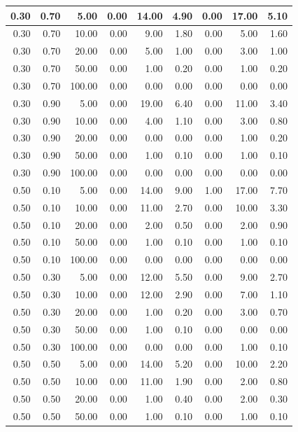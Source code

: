 \documentclass{bmstu}
\begin{document}
\begin{longtable}{|r|r|r|r|r|r|r|r|r|}
0.30 & 0.70 & 5.00 & 0.00 & 14.00 & 4.90 & 0.00 & 17.00 & 5.10 \\ \hline
0.30 & 0.70 & 10.00 & 0.00 & 9.00 & 1.80 & 0.00 & 5.00 & 1.60 \\ \hline
0.30 & 0.70 & 20.00 & 0.00 & 5.00 & 1.00 & 0.00 & 3.00 & 1.00 \\ \hline
0.30 & 0.70 & 50.00 & 0.00 & 1.00 & 0.20 & 0.00 & 1.00 & 0.20 \\ \hline
0.30 & 0.70 & 100.00 & 0.00 & 0.00 & 0.00 & 0.00 & 0.00 & 0.00 \\ \hline
0.30 & 0.90 & 5.00 & 0.00 & 19.00 & 6.40 & 0.00 & 11.00 & 3.40 \\ \hline
0.30 & 0.90 & 10.00 & 0.00 & 4.00 & 1.10 & 0.00 & 3.00 & 0.80 \\ \hline
0.30 & 0.90 & 20.00 & 0.00 & 0.00 & 0.00 & 0.00 & 1.00 & 0.20 \\ \hline
0.30 & 0.90 & 50.00 & 0.00 & 1.00 & 0.10 & 0.00 & 1.00 & 0.10 \\ \hline
0.30 & 0.90 & 100.00 & 0.00 & 0.00 & 0.00 & 0.00 & 0.00 & 0.00 \\ \hline
0.50 & 0.10 & 5.00 & 0.00 & 14.00 & 9.00 & 1.00 & 17.00 & 7.70 \\ \hline
0.50 & 0.10 & 10.00 & 0.00 & 11.00 & 2.70 & 0.00 & 10.00 & 3.30 \\ \hline
0.50 & 0.10 & 20.00 & 0.00 & 2.00 & 0.50 & 0.00 & 2.00 & 0.90 \\ \hline
0.50 & 0.10 & 50.00 & 0.00 & 1.00 & 0.10 & 0.00 & 1.00 & 0.10 \\ \hline
0.50 & 0.10 & 100.00 & 0.00 & 0.00 & 0.00 & 0.00 & 0.00 & 0.00 \\ \hline
0.50 & 0.30 & 5.00 & 0.00 & 12.00 & 5.50 & 0.00 & 9.00 & 2.70 \\ \hline
0.50 & 0.30 & 10.00 & 0.00 & 12.00 & 2.90 & 0.00 & 7.00 & 1.10 \\ \hline
0.50 & 0.30 & 20.00 & 0.00 & 1.00 & 0.20 & 0.00 & 3.00 & 0.70 \\ \hline
0.50 & 0.30 & 50.00 & 0.00 & 1.00 & 0.10 & 0.00 & 0.00 & 0.00 \\ \hline
0.50 & 0.30 & 100.00 & 0.00 & 0.00 & 0.00 & 0.00 & 1.00 & 0.10 \\ \hline
0.50 & 0.50 & 5.00 & 0.00 & 14.00 & 5.20 & 0.00 & 10.00 & 2.20 \\ \hline
0.50 & 0.50 & 10.00 & 0.00 & 11.00 & 1.90 & 0.00 & 2.00 & 0.80 \\ \hline
0.50 & 0.50 & 20.00 & 0.00 & 1.00 & 0.40 & 0.00 & 2.00 & 0.30 \\ \hline
0.50 & 0.50 & 50.00 & 0.00 & 1.00 & 0.10 & 0.00 & 1.00 & 0.10 \\ \hline

\end{longtable}
\end{document}
